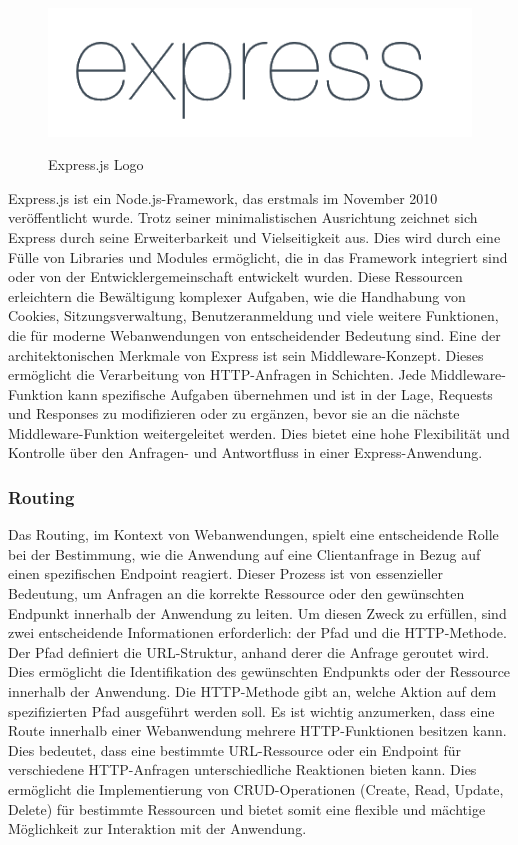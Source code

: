 \begin{figure}[h!]
    \centering
    \includegraphics[width=0.8\linewidth]{pics/express_logo.png}
    \caption{Express.js Logo}
    \label{fig:enter-label}
    \cite{express_js_logo}
\end{figure}
Express.js ist ein Node.js-Framework, das erstmals im November 2010 veröffentlicht wurde. Trotz seiner minimalistischen Ausrichtung zeichnet sich Express durch seine Erweiterbarkeit und Vielseitigkeit aus. Dies wird durch eine Fülle von Libraries und Modules ermöglicht, die in das Framework integriert sind oder von der Entwicklergemeinschaft entwickelt wurden. Diese Ressourcen erleichtern die Bewältigung komplexer Aufgaben, wie die Handhabung von Cookies, Sitzungsverwaltung, Benutzeranmeldung und viele weitere Funktionen, die für moderne Webanwendungen von entscheidender Bedeutung sind.
\newline
Eine der architektonischen Merkmale von Express ist sein Middleware-Konzept. Dieses ermöglicht die Verarbeitung von HTTP-Anfragen in Schichten. Jede Middleware-Funktion kann spezifische Aufgaben übernehmen und ist in der Lage, Requests und Responses zu modifizieren oder zu ergänzen, bevor sie an die nächste Middleware-Funktion weitergeleitet werden. Dies bietet eine hohe Flexibilität und Kontrolle über den Anfragen- und Antwortfluss in einer Express-Anwendung.
\cite{Express_js_Introduction}

\subsubsection{Routing}
Das Routing, im Kontext von Webanwendungen, spielt eine entscheidende Rolle bei der Bestimmung, wie die Anwendung auf eine Clientanfrage in Bezug auf einen spezifischen Endpoint reagiert. Dieser Prozess ist von essenzieller Bedeutung, um Anfragen an die korrekte Ressource oder den gewünschten Endpunkt innerhalb der Anwendung zu leiten. Um diesen Zweck zu erfüllen, sind zwei entscheidende Informationen erforderlich: der Pfad und die HTTP-Methode.
\newline
Der Pfad definiert die URL-Struktur, anhand derer die Anfrage geroutet wird. Dies ermöglicht die Identifikation des gewünschten Endpunkts oder der Ressource innerhalb der Anwendung. Die HTTP-Methode gibt an, welche Aktion auf dem spezifizierten Pfad ausgeführt werden soll. Es ist wichtig anzumerken, dass eine Route innerhalb einer Webanwendung mehrere HTTP-Funktionen besitzen kann. Dies bedeutet, dass eine bestimmte URL-Ressource oder ein Endpoint für verschiedene HTTP-Anfragen unterschiedliche Reaktionen bieten kann. Dies ermöglicht die Implementierung von CRUD-Operationen (Create, Read, Update, Delete) für bestimmte Ressourcen und bietet somit eine flexible und mächtige Möglichkeit zur Interaktion mit der Anwendung.
\cite{Express_js_basic_routing}
\cite{Express_js_routing}

